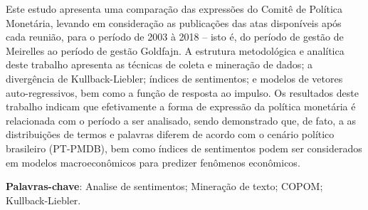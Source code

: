 %
%

\begin{resumo}
Este estudo apresenta uma comparação das expressões do Comitê de Política Monetária, levando em consideração as publicações das atas disponíveis após cada reunião, para o período de 2003 à 2018 -- isto é, do período de gestão de Meirelles ao período de gestão Goldfajn. A estrutura metodológica e analítica deste trabalho apresenta as técnicas de coleta e mineração de dados; a divergência de Kullback-Liebler; índices de sentimentos; e modelos de vetores auto-regressivos, bem como a função de resposta ao impulso. Os resultados deste trabalho indicam que efetivamente a forma de expressão da política monetária é relacionada com o período a ser analisado, sendo demonstrado que, de fato, a as distribuições de termos e palavras diferem de acordo com o cenário político brasileiro (PT-PMDB), bem como índices de sentimentos podem ser considerados em modelos macroeconômicos para predizer fenômenos econômicos.

\textbf{Palavras-chave}: Analise de sentimentos; Mineração de texto; COPOM; Kullback-Liebler.
\end{resumo}


